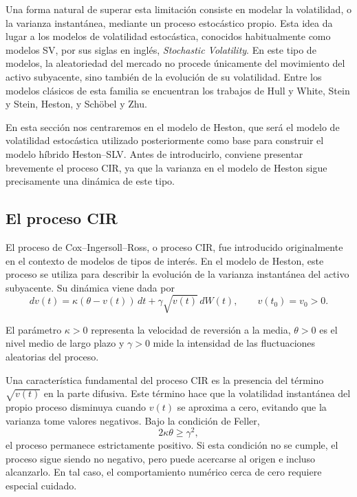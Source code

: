 Una forma natural de superar esta limitación consiste en modelar la volatilidad, o la varianza instantánea, mediante un proceso estocástico propio. Esta idea da lugar a los modelos de volatilidad estocástica, conocidos habitualmente como modelos SV, por sus siglas en inglés, \textit{Stochastic Volatility}. En este tipo de modelos, la aleatoriedad del mercado no procede únicamente del movimiento del activo subyacente, sino también de la evolución de su volatilidad. Entre los modelos clásicos de esta familia se encuentran los trabajos de Hull y White, Stein y Stein, Heston, y Schöbel y Zhu. \medskip

En esta sección nos centraremos en el modelo de Heston, que será el modelo de volatilidad estocástica utilizado posteriormente como base para construir el modelo híbrido Heston--SLV. Antes de introducirlo, conviene presentar brevemente el proceso CIR, ya que la varianza en el modelo de Heston sigue precisamente una dinámica de este tipo.

\subsection{El proceso CIR}

El proceso de Cox--Ingersoll--Ross, o proceso CIR, fue introducido originalmente en el contexto de modelos de tipos de interés. En el modelo de Heston, este proceso se utiliza para describir la evolución de la varianza instantánea del activo subyacente. Su dinámica viene dada por
\begin{equation}
\label{eq:cir_process}
dv(t)=\kappa(\theta-v(t))\,dt+\gamma\sqrt{v(t)}\,dW(t),
\qquad v(t_0)=v_0>0.
\end{equation}

El parámetro \(\kappa>0\) representa la velocidad de reversión a la media, \(\theta>0\) es el nivel medio de largo plazo y \(\gamma>0\) mide la intensidad de las fluctuaciones aleatorias del proceso. 

Una característica fundamental del proceso CIR es la presencia del término $\sqrt{v(t)}$ en la parte difusiva. Este término hace que la volatilidad instantánea del propio proceso disminuya cuando $v(t)$ se aproxima a cero, evitando que la varianza tome valores negativos. Bajo la condición de Feller,
\begin{equation}
\label{eq:feller_condition}
2\kappa\theta\geq \gamma^2,
\end{equation}
el proceso permanece estrictamente positivo. Si esta condición no se cumple, el proceso sigue siendo no negativo, pero puede acercarse al origen e incluso alcanzarlo. En tal caso, el comportamiento numérico cerca de cero requiere especial cuidado. \medskip

